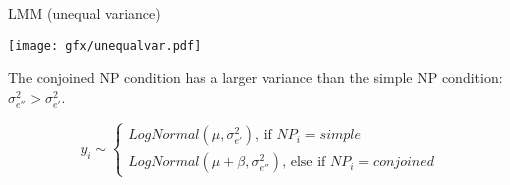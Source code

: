 
\begin{frame}{LMM (unequal variance)}
	\begin{minipage}{.45\linewidth}
		\begin{center}
			\texttt{[image: gfx/unequalvar.pdf]}
		\end{center}
	\end{minipage}
	\hfill
	\begin{minipage}{.5\linewidth}
		\begin{footnotesize}
			The conjoined NP condition has a larger variance than the simple NP condition: $\sigma_{e''}^2 > \sigma_{e'}^2$.
		\end{footnotesize}
			
		\begin{tiny}
			\begin{equation}
			y_{i} \sim
			\begin{cases} 
			LogNormal(\mu, \sigma_{e'}^2) \text{, if } NP_i = simple\\
			LogNormal(\mu + \beta, \sigma_{e''}^2) \text{, else if } NP_i = conjoined
			\end{cases}
			\end{equation}
		\end{tiny}
			
	
	\end{minipage}
	
\end{frame}

